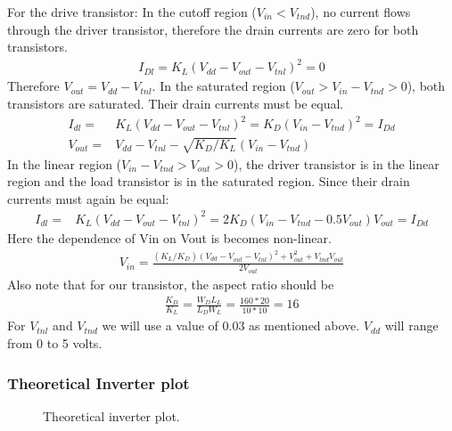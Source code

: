 \documentclass{article}
\begin{document}
For the drive transistor: In the cutoff region ($V_{in}<V_{tnd}$), no current flows through the driver transistor, therefore the drain currents are zero for both transistors.
\begin{align*}
I_{Dl} = K_L(V_{dd} - V_{out} - V_{tnl})^2 = 0
\end{align*}
Therefore $V_{out} = V_{dd} - V_{tnl}$. In the saturated region ($V_{out} >V_{in}-V_{tnd}>0$), both transistors are saturated. Their drain currents must be equal.
\begin{align*}
I_{dl} =& K_L(V_{dd} - V_{out} - V_{tnl})^2 = K_D(V_{in} - V_{tnd})^2 = I_{Dd} \\
V_{out} =& V_{dd} - V_{tnl} - \sqrt{K_D/K_L}(V_{in} - V_{tnd})
\end{align*}
In the linear region ($V_{in}-V_{tnd}>V_{out} >0$), the driver transistor is in the linear region and the load transistor is in the saturated region. Since their drain currents must again be equal:
\begin{align*}
I_{dl} =& K_L(V_{dd} - V_{out} - V_{tnl})^2 = 2K_D(V_{in} - V_{tnd} - 0.5V_{out})V_{out} = I_{Dd}
\end{align*}
Here the dependence of Vin on Vout is becomes non-linear. 
\begin{align*}
V_{in} = \frac{(K_L/K_D)(V_{dd} - V_{out} - V_{tnl})^2 + V_{out}^2 + V_{tnd}V_{out}}{2V_{out}}
\end{align*}
Also note that for our transistor, the aspect ratio should be
\begin{align*}
\frac{K_D}{K_L} = \frac{W_DL_L}{L_DW_L} = \frac{160*20}{10*10} = 16
\end{align*}
For $V_{tnl}$ and $V_{tnd}$ we will use a value of 0.03 as mentioned above. $V_{dd}$ will range from 0 to 5 volts.

\subsubsection{Theoretical Inverter plot}
\begin{figure}[H]
\centering
{}
\caption{Theoretical inverter plot.}
\end{figure}
\end{document}
